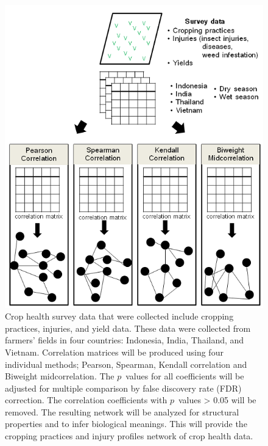 \begin{figure}
\centering
\includegraphics[width = 6in]{pipeline}
\caption[Network method for characterizing interactions between injury profiles and cropping practices using correlation measures]{Crop health survey data that were collected include cropping practices, injuries, and yield data. These data were collected from farmers' fields in four countries: Indonesia, India, Thailand, and Vietnam. Correlation matrices will be produced using four individual methods; Pearson, Spearman, Kendall correlation and Biweight midcorrelation. The $p$~values for all coefficients will be adjusted for multiple comparison by false discovery rate (FDR) correction. The correlation coefficients with $p$~values > 0.05 will be removed. The resulting network will be analyzed for structural properties and to infer biological meanings. This will provide the cropping practices and injury profiles network of crop health data.}
\end{figure}

